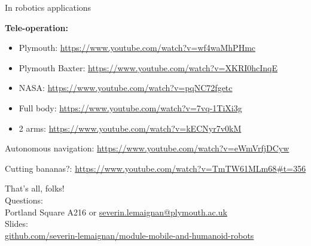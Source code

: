 \documentclass[compress]{beamer}
\begin{document}
\begin{frame}{In robotics applications}

    \textbf{Tele-operation:}

    \begin{itemize}

        \item
              Plymouth: \url{https://www.youtube.com/watch?v=wf4waMhPHmc}
        \item
              Plymouth Baxter: \url{https://www.youtube.com/watch?v=XKRI0hcInqE}
        \item
              NASA: \url{https://www.youtube.com/watch?v=pqNC72fgetc}
        \item
              Full body: \url{https://www.youtube.com/watch?v=7vq-1TiXi3g}
        \item
              2 arms: \url{https://www.youtube.com/watch?v=kECNyr7v0kM}
    \end{itemize}

    Autonomous navigation: \url{https://www.youtube.com/watch?v=eWmVrfjDCyw}

    Cutting bananas?:
    \url{https://www.youtube.com/watch?v=TmTW61MLm68\#t=356}

\end{frame}


\begin{frame}{}
    \begin{center}
        \Large
        That's all, folks!\\[2em]
        \normalsize
        Questions:\\
        Portland Square A216 or \url{severin.lemaignan@plymouth.ac.uk} \\[1em]

        Slides:\\ \href{https://github.com/severin-lemaignan/module-mobile-and-humanoid-robots}{\small github.com/severin-lemaignan/module-mobile-and-humanoid-robots}

    \end{center}
\end{frame}
\end{document}
